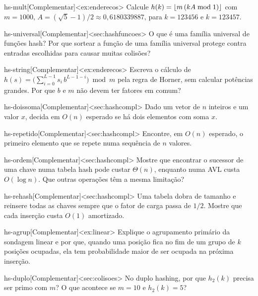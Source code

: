 \begin{exercicio}{hs-mult}[Complementar]<ex:enderecos>
Calcule $h(k)=\lfloor m\,(kA\bmod1)\rfloor$ com $m=1000$, $A=(\sqrt5-1)/2\approx0{,}6180339887$, para $k=123456$ e $k=123457$.
\end{exercicio}
\begin{exercicio}{hs-universal}[Complementar]<sec:hashfuncoes>
O que é uma família universal de funções hash? Por que sortear a função de uma família universal protege contra entradas escolhidas para causar muitas colisões?
\end{exercicio}
\begin{exercicio}{hs-string}[Complementar]<ex:enderecos>
Escreva o cálculo de $h(s)=\big(\sum_{i=0}^{L-1}s_i\,b^{L-1-i}\big)\bmod m$ pela regra de Horner, sem calcular potências grandes. Por que $b$ e $m$ não devem ter fatores em comum?
\end{exercicio}
\begin{exercicio}{hs-doissoma}[Complementar]<sec:hashcompl>
Dado um vetor de $n$ inteiros e um valor $x$, decida em $O(n)$ esperado se há dois elementos com soma $x$.
\end{exercicio}
\begin{exercicio}{hs-repetido}[Complementar]<sec:hashcompl>
Encontre, em $O(n)$ esperado, o primeiro elemento que se repete numa sequência de $n$ valores.
\end{exercicio}
\begin{exercicio}{hs-ordem}[Complementar]<sec:hashcompl>
Mostre que encontrar o sucessor de uma chave numa tabela hash pode custar $\Theta(n)$, enquanto numa AVL custa $O(\log n)$. Que outras operações têm a mesma limitação?
\end{exercicio}
\begin{exercicio}{hs-rehash}[Complementar]<sec:hashcompl>
Uma tabela dobra de tamanho e reinsere todas as chaves sempre que o fator de carga passa de $1/2$. Mostre que cada inserção custa $O(1)$ amortizado.
\end{exercicio}
\begin{exercicio}{hs-agrup}[Complementar]<ex:linear>
Explique o agrupamento primário da sondagem linear e por que, quando uma posição fica no fim de um grupo de $k$ posições ocupadas, ela tem probabilidade maior de ser ocupada na próxima inserção.
\end{exercicio}
\begin{exercicio}{hs-duplo}[Complementar]<sec:colisoes>
No duplo hashing, por que $h_2(k)$ precisa ser primo com $m$? O que acontece se $m=10$ e $h_2(k)=5$?
\end{exercicio}

